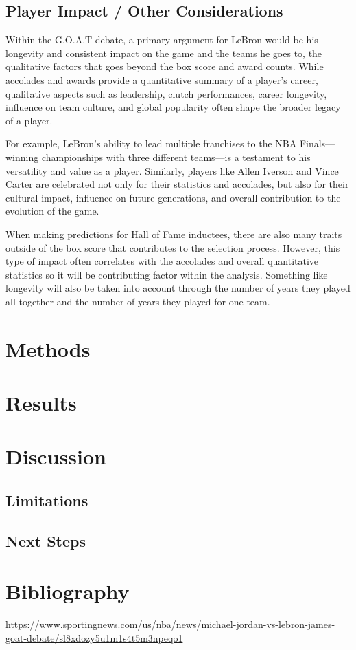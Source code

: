 \documentclass[
  11pt,
]{article}
\begin{document}
\subsection{Player Impact / Other
Considerations}\label{player-impact-other-considerations}

Within the G.O.A.T debate, a primary argument for LeBron would be his
longevity and consistent impact on the game and the teams he goes to,
the qualitative factors that goes beyond the box score and award counts.
While accolades and awards provide a quantitative summary of a player's
career, qualitative aspects such as leadership, clutch performances,
career longevity, influence on team culture, and global popularity often
shape the broader legacy of a player.

For example, LeBron's ability to lead multiple franchises to the NBA
Finals---winning championships with three different teams---is a
testament to his versatility and value as a player. Similarly, players
like Allen Iverson and Vince Carter are celebrated not only for their
statistics and accolades, but also for their cultural impact, influence
on future generations, and overall contribution to the evolution of the
game.

When making predictions for Hall of Fame inductees, there are also many
traits outside of the box score that contributes to the selection
process. However, this type of impact often correlates with the
accolades and overall quantitative statistics so it will be contributing
factor within the analysis. Something like longevity will also be taken
into account through the number of years they played all together and
the number of years they played for one team.

\section{Methods}\label{methods}

\section{Results}\label{results}

\section{Discussion}\label{discussion}

\subsection{Limitations}\label{limitations}

\subsection{Next Steps}\label{next-steps}

\section{Bibliography}\label{bibliography}

\url{https://www.sportingnews.com/us/nba/news/michael-jordan-vs-lebron-james-goat-debate/sl8xdozy5u1m1s4t5m3npeqo1}
\end{document}
